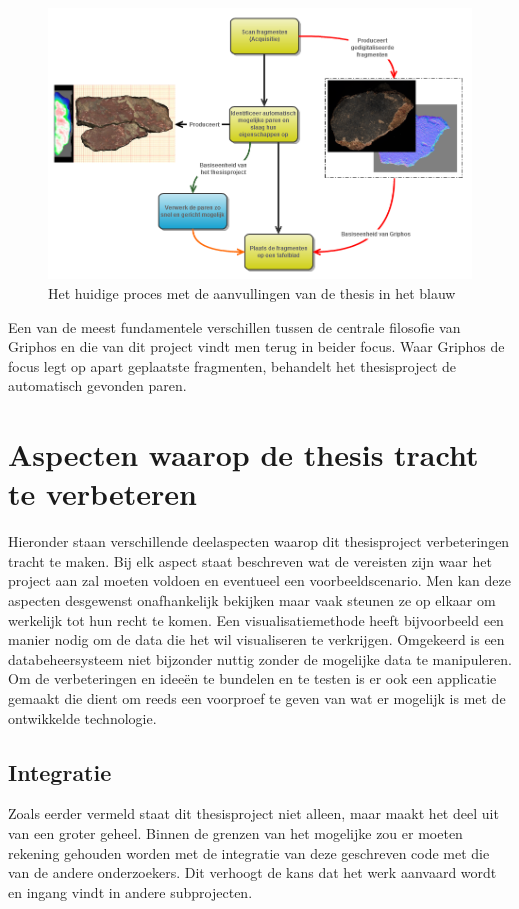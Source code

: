 \begin{figure}[ht]
	\begin{center}
		\includegraphics[width=1.0\columnwidth]{images/flowchart-focus-01.png}
		\caption{Het huidige proces met de aanvullingen van de thesis in het blauw}
		\label{fig:flow}
	\end{center}
\end{figure}

Een van de meest fundamentele verschillen tussen de centrale filosofie van Griphos en die van dit project vindt men terug in beider focus. Waar Griphos de focus legt op apart geplaatste fragmenten, behandelt het thesisproject de automatisch gevonden paren. \\

\section{Aspecten waarop de thesis tracht te verbeteren}
Hieronder staan verschillende deelaspecten waarop dit thesisproject verbeteringen tracht te maken. Bij elk aspect staat beschreven wat de vereisten zijn waar het project aan zal moeten voldoen en eventueel een voorbeeldscenario. Men kan deze aspecten desgewenst onafhankelijk bekijken maar vaak steunen ze op elkaar om werkelijk tot hun recht te komen. Een visualisatiemethode heeft bijvoorbeeld een manier nodig om de data die het wil visualiseren te verkrijgen. Omgekeerd is een databeheersysteem niet bijzonder nuttig zonder de mogelijke data te manipuleren. Om de verbeteringen en idee\"en te bundelen en te testen is er ook een applicatie gemaakt die dient om reeds een voorproef te geven van wat er mogelijk is met de ontwikkelde technologie.  

\subsection{Integratie}
Zoals eerder vermeld staat dit thesisproject niet alleen, maar maakt het deel uit van een groter geheel. Binnen de grenzen van het mogelijke zou er moeten rekening gehouden worden met de integratie van deze geschreven code met die van de andere onderzoekers. Dit verhoogt de kans dat het werk aanvaard wordt en ingang vindt in andere subprojecten. 

